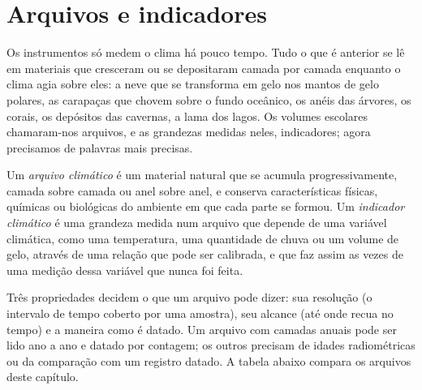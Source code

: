 \section{Arquivos e indicadores}\label{sec:b2:climate-proxies:archives}

Os instrumentos só medem o clima há pouco tempo. Tudo o que é anterior se lê em materiais
que cresceram ou se depositaram camada por camada enquanto o clima agia sobre eles: a neve que se transforma em gelo nos
mantos de gelo polares, as carapaças que chovem sobre o fundo oceânico, os anéis das árvores, os corais, os depósitos das
cavernas, a lama dos lagos. Os volumes escolares chamaram-nos arquivos, e as grandezas medidas
neles, indicadores; agora precisamos de palavras mais precisas.

\begin{definition}\label{def:b2:climate-proxies:proxy}
Um \emph{arquivo climático} é um material natural que se acumula
progressivamente, camada sobre camada ou anel sobre anel, e conserva características físicas, químicas ou biológicas
do ambiente em que cada parte se formou. Um \emph{indicador
climático} é uma grandeza medida num arquivo que depende de uma variável
climática, como uma temperatura, uma quantidade de chuva ou um volume de gelo, através de uma relação que pode
ser calibrada, e que faz assim as vezes de uma medição dessa variável que nunca foi feita.
\end{definition}

Três propriedades decidem o que um arquivo pode dizer: sua resolução (o intervalo de tempo coberto por uma
amostra), seu alcance (até onde recua no tempo) e a maneira como é datado. Um arquivo com camadas anuais pode ser
lido ano a ano e datado por contagem; os outros precisam de idades radiométricas ou da comparação com um
registro datado. A tabela abaixo compara os arquivos deste capítulo.

